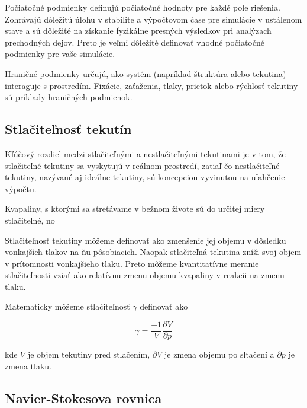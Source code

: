 \documentclass[]{tukediphc}
\begin{document}
Počiatočné podmienky definujú počiatočné hodnoty pre každé pole riešenia. Zohrávajú dôležitú úlohu v stabilite a výpočtovom čase pre simulácie v ustálenom stave a sú dôležité na získanie fyzikálne presných výsledkov pri analýzach prechodných dejov. Preto je veľmi dôležité definovať vhodné počiatočné podmienky pre vaše simulácie.

Hraničné podmienky určujú, ako systém (napríklad štruktúra alebo tekutina) interaguje s prostredím. Fixácie, zaťaženia, tlaky, prietok alebo rýchlosť tekutiny sú príklady hraničných podmienok.

\subsection{Stlačiteľnosť tekutín}

Kľúčový rozdiel medzi stlačiteľnými a nestlačiteľnými tekutinami je v tom, že stlačiteľné tekutiny sa vyskytujú v reálnom prostredí, zatiaľ čo nestlačiteľné tekutiny, nazývané aj ideálne tekutiny, sú koncepciou vyvinutou na uľahčenie výpočtu.

Kvapaliny, s ktorými sa stretávame v bežnom živote sú do určitej miery stlačiteľné, no 


Stlačiteľnosť tekutiny môžeme definovať ako zmenšenie jej objemu v dôsledku vonkajších tlakov na ňu pôsobiacich. Naopak stlačiteľná tekutina zníži svoj objem v prítomnosti vonkajšieho tlaku. Preto môžeme kvantitatívne meranie stlačiteľnosti vziať ako relatívnu zmenu objemu kvapaliny v reakcii na zmenu tlaku.

Matematicky môžeme stlačiteľnosť $\gamma$ definovať ako

\begin{equation}
	\gamma = \frac{-1}{V} \frac{\partial V}{\partial p}
\end{equation}

kde $V$ je objem tekutiny pred stlačením, $\partial V$ je zmena objemu po sltačení a $\partial p$ je zmena tlaku.

\subsection{Navier-Stokesova rovnica}
\end{document}
